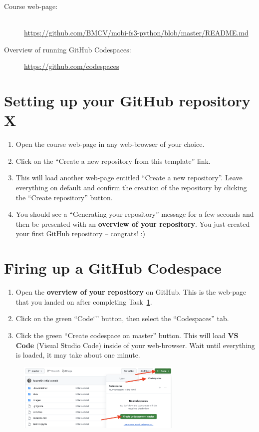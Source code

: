\documentclass[12pt,a4paper]{article}
\begin{document}
\begin{description}
\item[Course web-page:]~\\\url{https://github.com/BMCV/mobi-fs3-python/blob/master/README.md}
\item[Overview of running GitHub Codespaces:] \url{https://github.com/codespaces}
\end{description}

\section{Setting up your GitHub repository X}
\label{task:preparation}
\begin{enumerate}
\item Open the course web-page in any web-browser of your choice.
\item Click on the ``Create a new repository from this template'' link.
\item This will load another web-page entitled ``Create a new repository''. Leave everything on default and confirm the creation of the repository by clicking the ``Create repository'' button.
\item You should see a ``Generating your repository'' message for a few seconds and then be presented with an \textbf{overview of your repository}. You just created your first GitHub repository -- congrats! :)
\end{enumerate}

\section{Firing up a GitHub Codespace}
\label{task:codespaces}
\begin{enumerate}
\item Open the \textbf{overview of your repository} on GitHub. This is the web-page that you landed on after completing Task~\ref{task:preparation}.
\item Click on the green ``Code`'' button, then select the ``Codespaces'' tab.
\item Click the green ``Create codespace on master'' button. This will load \textbf{VS Code} (Visual Studio Code) inside of your web-browser. Wait until everything is loaded, it may take about one minute.
\end{enumerate}

\begin{figure}[h!]
    \centering
    \includegraphics[width=0.7\textwidth]{images/codespaces.png}
\end{figure}
\end{document}
